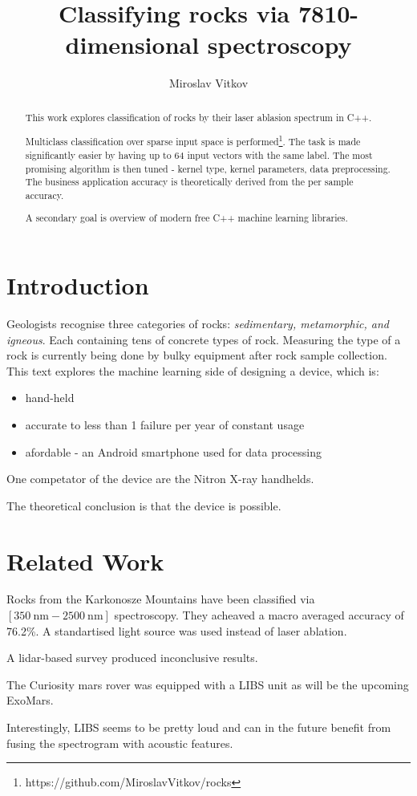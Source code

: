 \documentclass{article}
\title{Classifying rocks via 7810-dimensional spectroscopy}
\author{Miroslav Vitkov}
\begin{document}
\maketitle


\begin{abstract}
This work explores classification of rocks by their laser ablasion spectrum in C++.

Multiclass classification over sparse input space is performed\footnote{https://github.com/MiroslavVitkov/rocks}.
The task is made significantly easier by having up to 64 input vectors with the same label.
The most promising algorithm is then tuned - kernel type, kernel parameters, data preprocessing.
The business application accuracy is theoretically derived from the per sample accuracy.

A secondary goal is overview of modern free C++ machine learning libraries.
\end{abstract}


\section{Introduction}
Geologists recognise three categories of rocks: \textit{sedimentary, metamorphic, and igneous}.
Each containing tens of concrete types of rock.
Measuring the type of a rock is currently being done by bulky equipment after rock sample collection.
This text explores the machine learning side of designing a device, which is:
\begin{itemize}
\item{hand-held}
\item{accurate to less than 1 failure per year of constant usage}
\item{afordable - an Android smartphone used for data processing}
\end{itemize}
\par
One competator of the device are the Nitron X-ray handhelds\cite{nitron}.
\\
\par
The theoretical conclusion is that the device is possible.


\section{Related Work}
Rocks from the Karkonosze Mountains have been classified via $[\SI{350}{\nano\metre}-\SI{2500}{\nano\metre}]$ spectroscopy\cite{karkonosze}.
They acheaved a macro averaged accuracy of 76.2\%.
A standartised light source was used instead of laser ablation.
\par
A lidar-based survey\cite{lidar} produced inconclusive results.
\par
The Curiosity mars rover was equipped with a LIBS unit\cite{curiosity} as will be the upcoming ExoMars\cite{exomars}.
\par
Interestingly, LIBS seems to be pretty loud and can in the future benefit from fusing the spectrogram with acoustic features\cite{microphone}.
\end{document}
